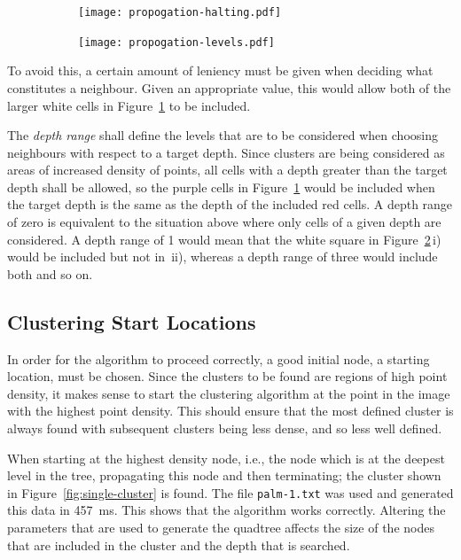 \begin{figure}[ht]
	\centering
	\begin{subfigure}[c]{0.6\linewidth}
		\texttt{[image: propogation-halting.pdf]}
		\caption{} \label{fig:propogation-halting}
	\end{subfigure}%
	\quad
	\begin{subfigure}[c]{0.35\linewidth}
		\texttt{[image: propogation-levels.pdf]}
		\caption{} \label{fig:propogation-levels}
	\end{subfigure}
	\caption{}\label{fig:prop-levels-halting}
\end{figure}

To avoid this, a certain amount of leniency must be given when deciding what
constitutes a neighbour. Given an appropriate value, this would allow both of
the larger white cells in Figure~\ref{fig:propogation-halting} to be included.

The \emph{depth range} shall define the levels that are to be considered when
choosing neighbours with respect to a target depth. Since clusters are being
considered as areas of increased density of points, all cells with a depth
greater than the target depth shall be allowed, so the purple cells in
Figure~\ref{fig:propogation-halting} would be included when the target depth is
the same as the depth of the included red cells. A depth range of zero is
equivalent to the situation above where only cells of a given depth are
considered. A depth range of 1 would mean that the white square in
Figure~\ref{fig:propogation-levels}\,i) would be included but not in~ii),
whereas a depth range of three would include both and so on.

\subsection{Clustering Start Locations}
\label{sub:clustering_start_locations}

In order for the algorithm to proceed correctly, a good initial node, a
starting location, must be chosen. Since the clusters to be found are regions
of high point density, it makes sense to start the clustering algorithm at the
point in the image with the highest point density. This should ensure that the
most defined cluster is always found with subsequent clusters being less dense,
and so less well defined.

When starting at the highest density node, i.e., the node which is at the
deepest level in the tree, propagating this node and then terminating; the
cluster shown in Figure~\ref{fig:single-cluster} is found. The file
\texttt{palm-1.txt} was used and generated this data in
\SI{457}{\milli\second}. This shows that the algorithm works correctly.
Altering the parameters that are used to generate the quadtree affects the size
of the nodes that are included in the cluster and the depth that is searched.

